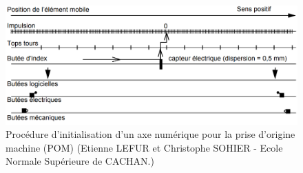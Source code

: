 \documentclass[12pt]{article}
\begin{document}
\begin{figure}
\centering
\includegraphics[width=0.85\linewidth]{pos1.PNG}
\caption{Procédure d’initialisation d’un axe numérique pour la prise d'origine machine (POM) (Etienne LEFUR et Christophe SOHIER - Ecole Normale Supérieure de CACHAN.)}
\label{m2}
\end{figure}

\end{document}
